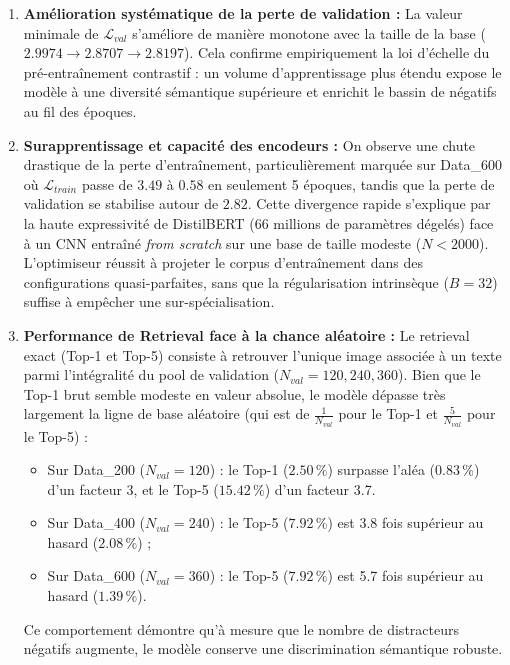 \documentclass[12pt,a4paper]{article}
\begin{document}
\begin{enumerate}
    \item \textbf{Amélioration systématique de la perte de validation :} La valeur minimale de $\mathcal{L}_{val}$ s'améliore de manière monotone avec la taille de la base ($2.9974 \rightarrow 2.8707 \rightarrow 2.8197$). Cela confirme empiriquement la loi d'échelle du pré-entraînement contrastif : un volume d'apprentissage plus étendu expose le modèle à une diversité sémantique supérieure et enrichit le bassin de négatifs au fil des époques.
    
    \item \textbf{Surapprentissage et capacité des encodeurs :} On observe une chute drastique de la perte d'entraînement, particulièrement marquée sur Data\_600 où $\mathcal{L}_{train}$ passe de $3.49$ à $0.58$ en seulement 5 époques, tandis que la perte de validation se stabilise autour de $2.82$. Cette divergence rapide s'explique par la haute expressivité de DistilBERT (66 millions de paramètres dégelés) face à un CNN entraîné \textit{from scratch} sur une base de taille modeste ($N < 2000$). L'optimiseur réussit à projeter le corpus d'entraînement dans des configurations quasi-parfaites, sans que la régularisation intrinsèque ($B=32$) suffise à empêcher une sur-spécialisation.
    
    \item \textbf{Performance de Retrieval face à la chance aléatoire :} Le retrieval exact (Top-1 et Top-5) consiste à retrouver l'unique image associée à un texte parmi l'intégralité du pool de validation ($N_{val} = 120, 240, 360$). Bien que le Top-1 brut semble modeste en valeur absolue, le modèle dépasse très largement la ligne de base aléatoire (qui est de $\frac{1}{N_{val}}$ pour le Top-1 et $\frac{5}{N_{val}}$ pour le Top-5) :
    \begin{itemize}
        \item Sur Data\_200 ($N_{val}=120$) : le Top-1 ($2.50\,\%$) surpasse l'aléa ($0.83\,\%$) d'un facteur 3, et le Top-5 ($15.42\,\%$) d'un facteur 3.7.
        \item Sur Data\_400 ($N_{val}=240$) : le Top-5 ($7.92\,\%$) est 3.8 fois supérieur au hasard ($2.08\,\%$) ;
        \item Sur Data\_600 ($N_{val}=360$) : le Top-5 ($7.92\,\%$) est 5.7 fois supérieur au hasard ($1.39\,\%$).
    \end{itemize}
    Ce comportement démontre qu'à mesure que le nombre de distracteurs négatifs augmente, le modèle conserve une discrimination sémantique robuste.
\end{enumerate}
\end{document}
